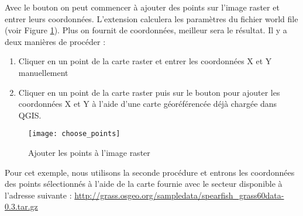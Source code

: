 Avec le bouton  on peut commencer \`a ajouter des points sur l'image raster et entrer leurs coordonn\'ees. L'extension calculera les param\`etres du fichier world file (voir Figure \ref{fig:choose_points}).
Plus on fournit de coordonn\'ees, meilleur sera le r\'esultat.
Il y a deux mani\`eres de proc\'eder :


\begin{enumerate}
\item Cliquer en un point de la carte raster et entrer les coordonn\'ees X et Y manuellement
\item Cliquer en un point de la carte raster puis sur le bouton  pour ajouter les coordonn\'ees X et Y \`a l'aide d'une carte g\'eor\'ef\'erenc\'ee d\'ej\`a charg\'ee dans QGIS.
\end{enumerate}


\begin{figure}[ht]
\begin{center}
  \caption{Ajouter les points \`a l'image raster \nixcaption}\label{fig:choose_points}\smallskip
  \texttt{[image: choose\_points]}
\end{center}
\end{figure}


Pour cet exemple, nous utilisons la seconde proc\'edure et entrons les coordonn\'ees des points s\'electionn\'es \`a l'aide de la carte  fournie avec le secteur  disponible \`a l'adresse suivante : \url{http://grass.osgeo.org/sampledata/spearfish\_grass60data-0.3.tar.gz}

